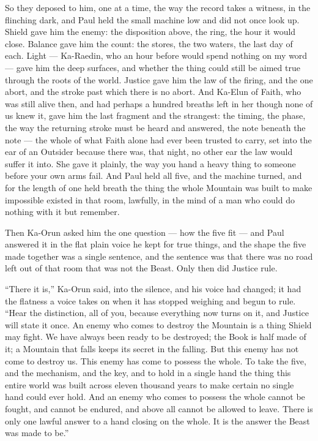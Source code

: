 \ornament

So they deposed to him, one at a time, the way the record takes a witness, in the flinching dark, and Paul held the small machine low and did not once look up. Shield gave him the enemy: the disposition above, the ring, the hour it would close. Balance gave him the count: the stores, the two waters, the last day of each. Light --- Ka-Raedin, who an hour before would spend nothing on my word --- gave him the deep surfaces, and whether the thing could still be aimed true through the roots of the world. Justice gave him the law of the firing, and the one abort, and the stroke past which there is no abort. And Ka-Elun of Faith, who was still alive then, and had perhaps a hundred breaths left in her though none of us knew it, gave him the last fragment and the strangest: the timing, the phase, the way the returning stroke must be heard and answered, the note beneath the note --- the whole of what Faith alone had ever been trusted to carry, set into the ear of an Outsider because there was, that night, no other ear the law would suffer it into. She gave it plainly, the way you hand a heavy thing to someone before your own arms fail. And Paul held all five, and the machine turned, and for the length of one held breath the thing the whole Mountain was built to make impossible existed in that room, lawfully, in the mind of a man who could do nothing with it but remember.\par

Then Ka-Orun asked him the one question --- how the five fit --- and Paul answered it in the flat plain voice he kept for true things, and the shape the five made together was a single sentence, and the sentence was that there was no road left out of that room that was not the Beast. Only then did Justice rule.\par

``There it is,'' Ka-Orun said, into the silence, and his voice had changed; it had the flatness a voice takes on when it has stopped weighing and begun to rule. ``Hear the distinction, all of you, because everything now turns on it, and Justice will state it once. An enemy who comes to destroy the Mountain is a thing Shield may fight. We have always been ready to be destroyed; the Book is half made of it; a Mountain that falls keeps its secret in the falling. But this enemy has not come to destroy us. This enemy has come to possess the whole. To take the five, and the mechanism, and the key, and to hold in a single hand the thing this entire world was built across eleven thousand years to make certain no single hand could ever hold. And an enemy who comes to possess the whole cannot be fought, and cannot be endured, and above all cannot be allowed to leave. There is only one lawful answer to a hand closing on the whole. It is the answer the Beast was made to be.''\par

